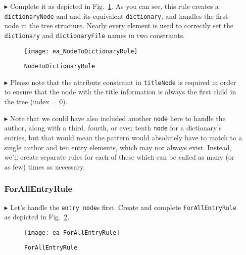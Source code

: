 \begin{itemize}
\item[$\blacktriangleright$] Complete it as depicted in Fig.~\ref{ea:NodeToDictionary_Complete}. As you can see, this rule creates a 
\texttt{dictionaryNode} and and its equivalent \texttt{dictionary}, and handles the first node in the tree structure. Nearly every
element is used to correctly set the \texttt{dictionary} and \texttt{dictionaryFile} names in two constraints.

\vspace{0.5cm}

\begin{figure}[htbp]
  \hspace{-0.7cm}
  \texttt{[image: ea\_NodeToDictionaryRule]}
  \caption{\texttt{NodeToDictionaryRule}}
  \label{ea:NodeToDictionary_Complete}
\end{figure}

\vspace{0.5cm}

\item[$\blacktriangleright$] Please note that the attribute constraint in \texttt{titleNode} is required in order to ensure that the node
with the title information is always the first child in the tree (index = 0). 

\newpage

\item[$\blacktriangleright$] Note that we could have also included another \texttt{node} here to handle the author, along with a third, fourth, or even
tenth \texttt{node} for a dictionary's entries, but that would mean the pattern would absolutely have to match to a single author and ten entry elements, which
may not always exist. Instead, we'll create separate rules for each of these which can be called as many (or as few) times as necessary.

\subsubsection{ForAllEntryRule} %

\item[$\blacktriangleright$] Let's handle the \texttt{entry node}s first. Create and complete \texttt{For\-All\-Ent\-ry\-Rule} as depicted in
Fig.~\ref{ea:ForAllEntry_Complete}. 

\vspace{0.5cm}

\begin{figure}[htbp]
\begin{center}
  \texttt{[image: ea\_ForAllEntryRule]}
  \caption{\texttt{ForAllEntryRule}}
  \label{ea:ForAllEntry_Complete}
\end{center}
\end{figure}


\end{itemize}
